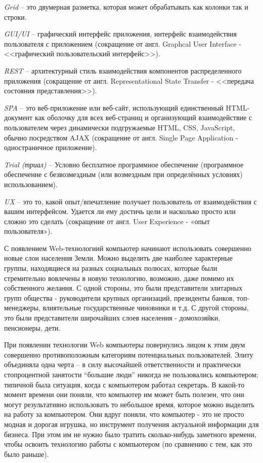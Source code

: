 \emph{Grid} -- это двумерная разметка, которая может обрабатывать как колонки так и строки.

\emph{GUI/UI} -- графический интерфейс приложения, интерфейс взаимодействия пользователя с приложением (сокращение от англ. Graphcal User Interface - <<графический пользовательский интерфейс>>).

\emph{REST} -- архитектурный стиль взаимодействия компонентов распределенного приложения (сокращение от англ. Representational State Transfer - <<передача состояния представления>>).

\emph{SPA} -- это веб-приложение или веб-сайт, использующий единственный HTML-документ как оболочку для всех веб-страниц и организующий взаимодействие с пользователем через динамически подгружаемые HTML, CSS, JavaScript, обычно посредством AJAX (сокращение от англ. Single Page Application - одностраничное приложение).

\emph{Trial (триал)} -- Условно бесплатное программное обеспечение (программное обеспечение с безвозмездным (или возмездным при определённых условиях) использованием).

\emph{UX} -- это то, какой опыт/впечатление получает пользователь от взаимодействия с вашим интерфейсом. Удается ли ему достичь цели и насколько просто или сложно это сделать (сокращение от англ. User Experience - «опыт пользователя»).

\label{sec:introduction}

С появлением Web-технологиий компьютер начинают использовать совершенно новые слои населения Земли. Можно выделить две наиболее характерные группы, находящиеся на разных социальных полюсах, которые были стремительно вовлечены в новую технологию, возможно, даже помимо их собственного желания. С одной стороны, это были представители элитарных групп общества - руководители крупных организаций, президенты банков, топ- менеджеры, влиятельные государственные чиновники и т.д. С другой стороны, это были представители широчайших слоев населения - домохозяйки, пенсионеры, дети.

При появлении технологии Web компьютеры повернулись лицом к этим двум совершенно противоположным категориям потенциальных пользователей. Элиту объединяла одна черта – в силу высочайшей ответственности и практически стопроцентной занятости “большие люди” никогда не пользовались компьютером; типичной была ситуация, когда с компьютером работал секретарь. В какой-то момент времени они поняли, что компьютер им может быть полезен, что они могут результативно использовать то небольшое время, которое можно выделить на работу за компьютером. Они вдруг поняли, что компьютер - это не просто модная и дорогая игрушка, но инструмент получения актуальной информации для бизнеса. При этом им не нужно было тратить сколько-нибудь заметного времени, чтобы освоить технологию работы с компьютером (по сравнению с тем, как это было раньше).

